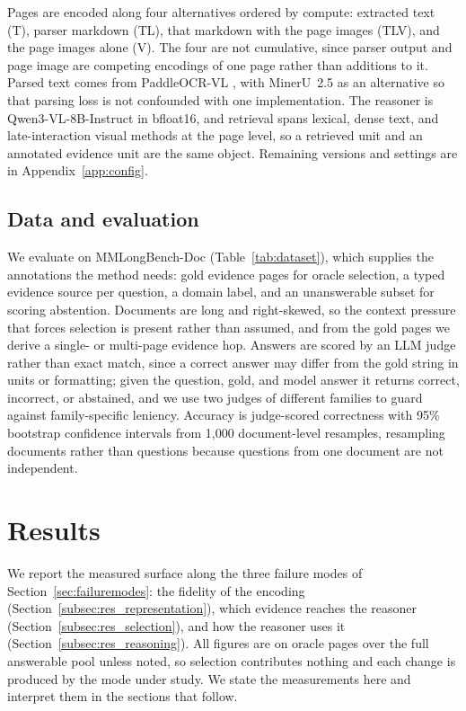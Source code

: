 \documentclass[11pt]{article}
\begin{document}
Pages are encoded along four alternatives ordered by compute: extracted text (T), parser markdown (TL), that markdown with the page images (TLV), and the page images alone (V). The four are not cumulative, since parser output and page image are competing encodings of one page rather than additions to it. Parsed text comes from PaddleOCR-VL \cite{cui2025paddleocrvl}, with MinerU~2.5 \cite{niu2025mineru25} as an alternative so that parsing loss is not confounded with one implementation. The reasoner is Qwen3-VL-8B-Instruct \cite{bai2025qwen3vl} in bfloat16, and retrieval spans lexical, dense text, and late-interaction visual methods at the page level, so a retrieved unit and an annotated evidence unit are the same object. Remaining versions and settings are in Appendix~\ref{app:config}.

\subsection{Data and evaluation}
\label{subsec:data}

We evaluate on MMLongBench-Doc \cite{ma2024mmlongbench} (Table~\ref{tab:dataset}), which supplies the annotations the method needs: gold evidence pages for oracle selection, a typed evidence source per question, a domain label, and an unanswerable subset for scoring abstention. Documents are long and right-skewed, so the context pressure that forces selection is present rather than assumed, and from the gold pages we derive a single- or multi-page evidence hop. Answers are scored by an LLM judge rather than exact match, since a correct answer may differ from the gold string in units or formatting; given the question, gold, and model answer it returns correct, incorrect, or abstained, and we use two judges of different families to guard against family-specific leniency. Accuracy is judge-scored correctness with 95\% bootstrap confidence intervals from 1{,}000 document-level resamples, resampling documents rather than questions because questions from one document are not independent.



\section{Results}
\label{sec:results}

We report the measured surface along the three failure modes of Section~\ref{sec:failuremodes}: the fidelity of the encoding (Section~\ref{subsec:res_representation}), which evidence reaches the reasoner (Section~\ref{subsec:res_selection}), and how the reasoner uses it (Section~\ref{subsec:res_reasoning}). All figures are on oracle pages over the full answerable pool unless noted, so selection contributes nothing and each change is produced by the mode under study. We state the measurements here and interpret them in the sections that follow.
\end{document}
